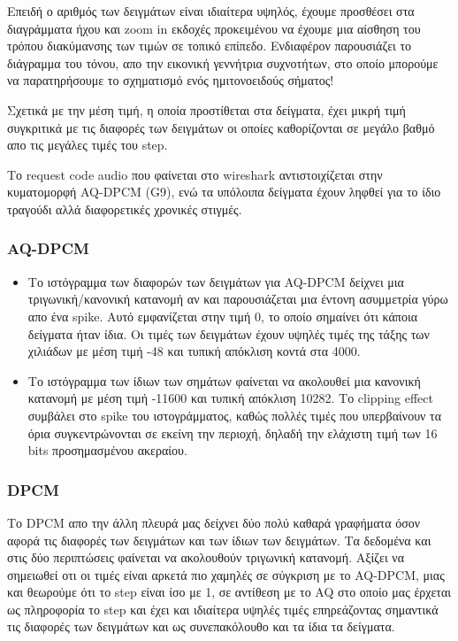 \documentclass[hidelinks, 12pt, a4paper]{article}
\begin{document}
Επειδή ο αριθμός των δειγμάτων είναι ιδιαίτερα υψηλός, έχουμε προσθέσει στα διαγράμματα ήχου και zoom in εκδοχές προκειμένου να έχουμε μια αίσθηση του τρόπου διακύμανσης των τιμών σε τοπικό επίπεδο. Ενδιαφέρον παρουσιάζει το διάγραμμα του τόνου, απο την εικονική γεννήτρια συχνοτήτων, στο οποίο μπορούμε να παρατηρήσουμε το σχηματισμό ενός ημιτονοειδούς σήματος!

Σχετικά με την μέση τιμή, η οποία προστίθεται στα δείγματα, έχει μικρή τιμή συγκριτικά με τις διαφορές των δειγμάτων οι οποίες καθορίζονται σε μεγάλο βαθμό απο τις μεγάλες τιμές του step.

Το request code audio που φαίνεται στο wireshark αντιστοιχίζεται στην κυματομορφή AQ-DPCM (G9), ενώ τα υπόλοιπα δείγματα έχουν ληφθεί για το ίδιο τραγούδι αλλά διαφορετικές χρονικές στιγμές.

\subsubsection{AQ-DPCM}

\begin{itemize}
    \item Το ιστόγραμμα των διαφορών των δειγμάτων για AQ-DPCM δείχνει μια τριγωνική/κανονική κατανομή αν και παρουσιάζεται μια έντονη ασυμμετρία γύρω απο ένα spike. Αυτό εμφανίζεται στην τιμή 0, το οποίο σημαίνει ότι κάποια δείγματα ήταν ίδια. Οι τιμές των δειγμάτων έχουν υψηλές τιμές της τάξης των χιλιάδων με μέση τιμή -48 και τυπική απόκλιση κοντά στα 4000.
    \item Το ιστόγραμμα των ίδιων των σημάτων φαίνεται να ακολουθεί μια κανονική κατανομή με μέση τιμή -11600 και τυπική απόκλιση 10282. Το clipping effect συμβάλει στο spike του ιστογράμματος, καθώς πολλές τιμές που υπερβαίνουν τα όρια συγκεντρώνονται σε εκείνη την περιοχή, δηλαδή την ελάχιστη τιμή των 16 bits προσημασμένου ακεραίου.
\end{itemize}


\subsubsection{DPCM}

Το DPCM απο την άλλη πλευρά μας δείχνει δύο πολύ καθαρά γραφήματα όσον αφορά τις διαφορές των δειγμάτων και των ίδιων των δειγμάτων. Τα δεδομένα και στις δύο περιπτώσεις φαίνεται να ακολουθούν τριγωνική κατανομή. Αξίζει να σημειωθεί οτι οι τιμές είναι αρκετά πιο χαμηλές σε σύγκριση με το AQ-DPCM, μιας και θεωρούμε ότι το step είναι ίσο με 1, σε αντίθεση με το AQ στο οποίο μας έρχεται ως πληροφορία το step και έχει και ιδιαίτερα υψηλές τιμές επηρεάζοντας σημαντικά τις διαφορές των δειγμάτων και ως συνεπακόλουθο και τα ίδια τα δείγματα.
\end{document}
